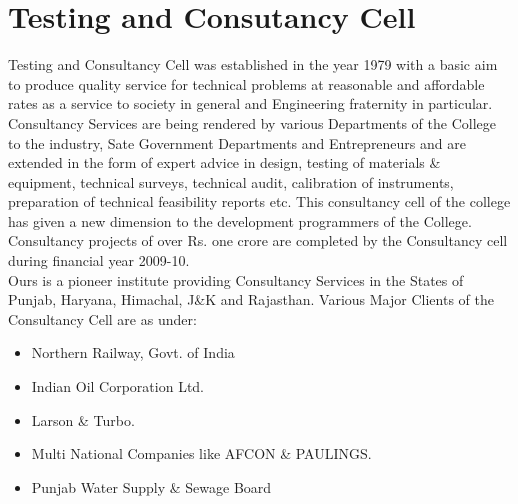 \section{Testing and Consutancy Cell}

Testing and Consultancy Cell was established in the year 1979 with a basic aim to produce
quality service for technical problems at reasonable and affordable rates as a service to society
in general and Engineering fraternity in particular.\\

Consultancy Services are being rendered by various Departments of the College to the
industry, Sate Government Departments and Entrepreneurs and are extended in the form of
expert advice in design, testing of materials \& equipment, technical surveys, technical audit,
calibration of instruments, preparation of technical feasibility reports etc.
This consultancy cell of the college has given a new dimension to the development
programmers of the College. Consultancy projects of over Rs. one crore are completed by the
Consultancy cell during financial year 2009-10. \\

Ours is a pioneer institute providing Consultancy Services in the States of Punjab, Haryana,
Himachal, J\&K and Rajasthan. Various Major Clients of the Consultancy Cell are as under:\\
\begin{itemize}
\item Northern Railway, Govt. of India
\item Indian Oil Corporation Ltd.
\item Larson \& Turbo.
\item Multi National Companies like AFCON \& PAULINGS.
\item Punjab Water Supply \& Sewage Board
\end{itemize}

